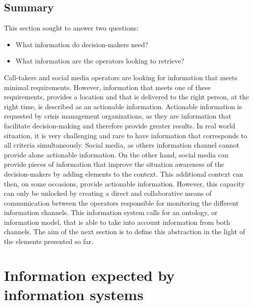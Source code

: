 \subsection*{Summary}
This section sought to answer two questions:
\begin{itemize}
    \item What information do decision-makers need?
    \item What information are the operators looking to retrieve?
\end{itemize}
Call-takers and social media operators are looking for information that meets minimal requirements.
However, information that meets one of these requirements, provides a location and that is delivered
to the right person, at the right time, is described as an actionable information.
Actionable information is requested by crisis management organizations, as they are information that
facilitate decision-making and therefore provide greater results.
In real world situation, it is very challenging and rare to have information that corresponds to all criteria simultaneously.
Social media, as others information channel cannot provide alone actionable information.
On the other hand, social media can provide pieces of information that improve the situation
awareness of the decision-makers by adding elements to the context.
This additional context can then, on some occasions, provide actionable information.
However, this capacity can only be unlocked by creating a direct and collaborative means
of communication between the operators responsible for monitoring the different information channels.
This information system calls for an ontology, or information model, that is able to take
into account information from both channels.
The aim of the next section is to define this abstraction in the light of the elements
presented so far.

\section{Information expected by information systems}

